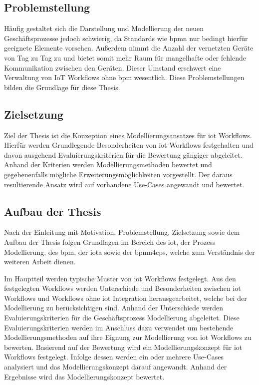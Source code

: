 \documentclass[a4paper, 12pt, twoside, headsepline=true]{scrartcl} %
\begin{document}
\subsection{Problemstellung} 
Häufig gestaltet sich die Darstellung und Modellierung der neuen Geschäftsprozesse jedoch schwierig, da Standards wie \ac{bpmn} nur bedingt hierfür geeignete Elemente vorsehen. Außerdem nimmt die Anzahl der vernetzten Geräte von Tag zu Tag zu und bietet somit mehr Raum für mangelhafte oder fehlende Kommunikation zwischen den Geräten. Dieser Umstand erschwert eine Verwaltung von IoT Workflows ohne \ac{bpm} wesentlich. Diese Problemstellungen bilden die Grundlage für diese Thesis.

\subsection{Zielsetzung}
Ziel der Thesis ist die Konzeption eines Modellierungsansatzes für \ac{iot}
Workflows. Hierfür werden Grundlegende Besonderheiten von \ac{iot} Workflows festgehalten und davon ausgehend Evaluierungskriterien für die Bewertung gängiger abgeleitet. Anhand der Kriterien werden Modellierungsmethoden bewertet und gegebenenfalls mögliche Erweiterungsmöglichkeiten vorgestellt. Der daraus resultierende Ansatz wird auf vorhandene Use-Cases angewandt und bewertet.

\subsection{Aufbau der Thesis}
Nach der Einleitung mit Motivation, Problemstellung, Zielsetzung
 sowie dem Aufbau der Thesis folgen Grundlagen im Bereich des \ac{iot}, der Prozess Modellierung, 
  des \ac{bpm}, der \ac{iota} sowie der \ac{bpmn4cps}, welche zum Verständnis der weiteren Arbeit dienen.
 
 Im Hauptteil werden typische Muster von \ac{iot} Workflows festgelegt. Aus den festgelegten Workflows werden Unterschiede und Besonderheiten zwischen \ac{iot} Workflows und Workflows ohne \ac{iot} Integration herausgearbeitet, welche bei der Modellierung zu berücksichtigen sind.
 Anhand der Unterschiede werden Evaluierungskriterien für die Geschäftsprozess Modellierung abgeleitet. Diese Evaluierungskriterien werden im Anschluss dazu verwendet um bestehende Modellierungsmethoden auf ihre Eignung zur Modellierung von \ac{iot} Workflows zu bewerten. Basierend auf der Bewertung wird ein Modellierungskonzept für \ac{iot} Workflows festgelegt. Infolge dessen werden ein oder mehrere Use-Cases analysiert und das Modellierungskonzept darauf angewandt. Anhand der Ergebnisse wird das Modellierungskonzept bewertet.
 
\end{document}
